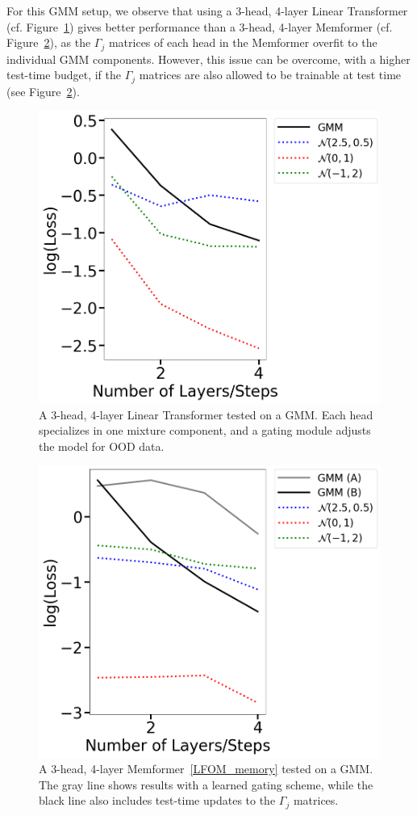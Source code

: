 \documentclass[11pt]{article}
\theoremstyle{plain}
\theoremstyle{definition}
\theoremstyle{remark}
\numberwithin{equation}{section}
\begin{document}
For this GMM setup, we observe that using a 3-head, 4-layer Linear Transformer (cf. Figure~\ref{fig:gaussian_mixture_model_ood_lt}) gives better performance than a 3-head, 4-layer Memformer (cf. Figure~\ref{fig:gaussian_mixture_model_ood_mem}), as the \(\Gamma_j\) matrices of each head in the Memformer overfit to the individual GMM components. However, this issue can be overcome, with a higher test-time budget, if the \(\Gamma_j\) matrices are also allowed to be trainable at test time (see Figure~\ref{fig:gaussian_mixture_model_ood_mem}).
\begin{figure}[t]
  \centering
  \includegraphics[width=0.7\linewidth]{gaussian_mixture_model_ood.png}
  \caption{%
  A 3-head, 4-layer Linear Transformer tested on a GMM. Each head specializes
  in one mixture component, and a gating module adjusts the model for OOD data.}
  \label{fig:gaussian_mixture_model_ood_lt}
\end{figure}
\begin{figure}[t]
  \centering
  \includegraphics[width=0.7\linewidth]{GMM_experiment_Gamma.png}
  \caption{%
  A 3-head, 4-layer Memformer~\eqref{LFOM_memory} tested on a GMM. The gray
  line shows results with a learned gating scheme, while the black line also
  includes test-time updates to the \(\Gamma_j\) matrices.}
  \label{fig:gaussian_mixture_model_ood_mem}
\end{figure}
\end{document}
